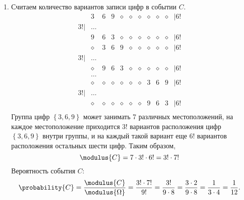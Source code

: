 \begin{enumerate}
    \item
    Считаем количество вариантов записи цифр в событии $C$.
    \begin{equation}
        \begin{array}{lccccccccccr}
            & 3        & 6        & 9        & \diamond & \diamond & \diamond & \diamond & \diamond & \diamond & | 6! \\
            3! | & \dots    &          &          &          &          &          &          &          &          &      \\
            & 9        & 6        & 3        & \diamond & \diamond & \diamond & \diamond & \diamond & \diamond & | 6! \\
            & \diamond & 3        & 6        & 9        & \diamond & \diamond & \diamond & \diamond & \diamond & | 6! \\
            3! | & \dots    &          &          &          &          &          &          &          &          &      \\
            & \diamond & 9        & 6        & 3        & \diamond & \diamond & \diamond & \diamond & \diamond & | 6! \\
            & \dots    &          &          &          &          &          &          &          &          &      \\
            & \diamond & \diamond & \diamond & \diamond & \diamond & \diamond & 3        & 6        & 9        & | 6! \\
            3! | & \dots    &          &          &          &          &          &          &          &          &      \\
            & \diamond & \diamond & \diamond & \diamond & \diamond & \diamond & 9        & 6        & 3        & | 6! \\
        \end{array}
    \end{equation}
    Группа цифр $\left \{ 3, 6, 9 \right \}$ может занимать 7 различных местоположений, на каждое местоположение приходится $3!$ вариантов расположения цифр $\left \{ 3, 6, 9 \right \}$ внутри группы,
    и на каждый такой вариант еще $6!$ вариантов расположения остальных шести цифр. Таким образом,
    \begin{equation}
        \modulus{C} = 7 \cdot 3! \cdot 6! = 3! \cdot 7!
    \end{equation}
    Вероятность события $C$:
    \begin{equation}
        \probability{C}
        = \frac{\modulus{C}}{\modulus{\Omega}}
        = \frac{3! \cdot 7!}{9!}
        = \frac{3!}{9 \cdot 8}
        = \frac{3 \cdot 2}{9 \cdot 8}
        = \frac{1}{3 \cdot 4}
        = \frac{1}{12} .
    \end{equation}
\end{enumerate}

